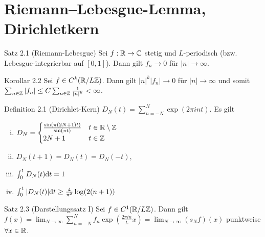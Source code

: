 \section{Riemann–Lebesgue-Lemma, Dirichletkern}

\begin{namedtheorem}{Satz 2.1 (Riemann-Lebesgue)}
  Sei $f:\mathbb{R}\rightarrow\mathbb{C}$ stetig und $L$-periodisch (bzw. Lebesgue-integrierbar auf $[0,1]$). Dann gilt $f_n \rightarrow 0$ für $|n|\rightarrow\infty$.
\end{namedtheorem}

\begin{namedtheorem}{Korollar 2.2}
  Sei $f\in C^k(\mathbb{R}/L\mathbb{Z})$. Dann gilt $|n|^k|f_n|\rightarrow0$ für $|n|\rightarrow\infty$ und somit $\sum_{n\in\mathbb{Z}}|f_n|\leq C\sum_{n\in\mathbb{Z}}\frac1{|n|^k}<\infty$.
\end{namedtheorem}

\begin{namedtheorem}{Definition 2.1 (Dirichlet-Kern)}
  $D_N(t)=\sum_{n=-N}^N \exp(2\pi int)$. Es gilt
  {\setlength\multicolsep{4pt}%
  \begin{multicols}{2}
  \begin{enumerate}[(i)]
    \item $D_N = \begin{cases}
      \frac{\sin(\pi(2N+1)t)}{\sin(\pi t)} & t\in\mathbb{R} \setminus \mathbb{Z} \\
      2N+1 & t\in\mathbb{Z}
    \end{cases}$
    \item $D_N(t+1) = D_N(t)=D_N(-t)$, 
    \item $\int_0^1D_N(t)\mathrm{d} t = 1$
    \item $\int_0^1|D_N(t)|\mathrm{d} t\geq \frac4{\pi^2}\log(2(n+1))$
  \end{enumerate}
  \end{multicols}}
\end{namedtheorem}

\begin{namedtheorem}{Satz 2.3 (Darstellungssatz I)}
  Sei $f\in C^1(\mathbb{R}/L\mathbb{Z})$. Dann gilt $f(x) = \lim_{N\rightarrow\infty} \sum_{n=-N}^N f_n \exp(\frac{2\pi in}{L}x) = \lim_{N\rightarrow\infty}(s_Nf)(x)$ punktweise $\forall x\in\mathbb{R}$.
\end{namedtheorem}

